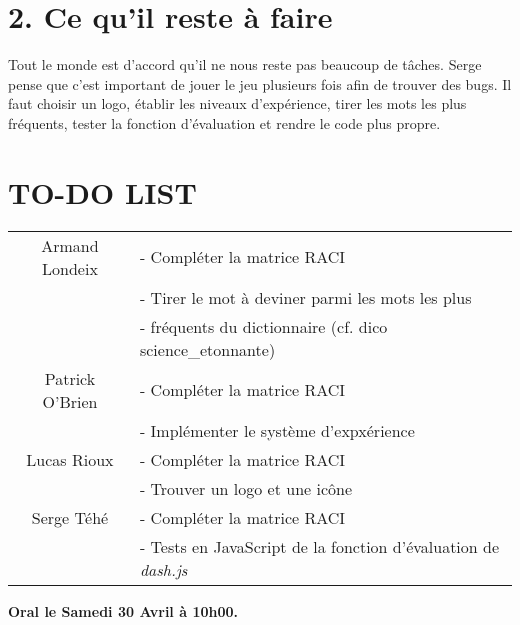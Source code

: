 \section*{2. Ce qu'il reste à faire}

\tabto{1cm}Tout le monde est d’accord qu'il ne nous reste pas beaucoup de tâches.
Serge pense que c’est important de jouer le jeu plusieurs fois afin de trouver des bugs.
Il faut choisir un logo, établir les niveaux d’expérience, tirer les mots les plus fréquents, tester la fonction d’évaluation et rendre le code plus propre.

\section*{TO-DO LIST}

\begin{center}
\begin{tabular}{|c|l|}
    \hline
    Armand Londeix & - Compléter la matrice RACI \\ 
    & - Tirer le mot à deviner parmi les mots les plus \\
    & - fréquents du dictionnaire (cf. dico science\_etonnante) \\
    \hline
    Patrick O'Brien & - Compléter la matrice RACI \\
    & - Implémenter le système d'expxérience \\
    \hline
    Lucas Rioux & - Compléter la matrice RACI \\
    & - Trouver un logo et une icône \\
    \hline
    Serge Téhé & - Compléter la matrice RACI \\
    & - Tests en JavaScript de la fonction d'évaluation de \emph{dash.js} \\
    \hline
\end{tabular}
\end{center}

\tabto{0cm}\textbf{Oral le Samedi 30 Avril à 10h00.}
